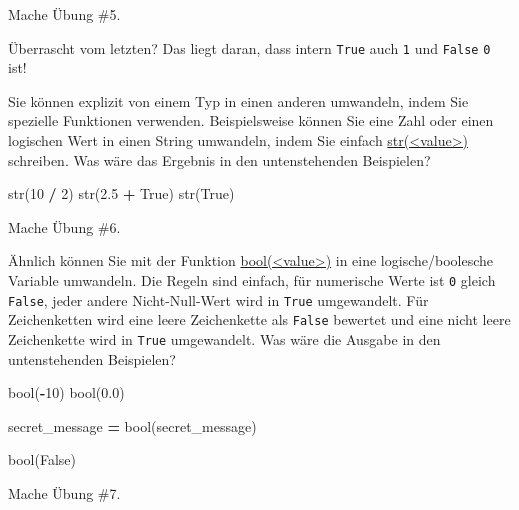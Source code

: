 \documentclass[
]{book}
\newenvironment{Shaded}{\begin{snugshade}}{\end{snugshade}}
\newcommand{\BuiltInTok}[1]{#1}
\newcommand{\DecValTok}[1]{\textcolor[rgb]{0.00,0.00,0.81}{#1}}
\newcommand{\FloatTok}[1]{\textcolor[rgb]{0.00,0.00,0.81}{#1}}
\newcommand{\NormalTok}[1]{#1}
\newcommand{\OperatorTok}[1]{\textcolor[rgb]{0.81,0.36,0.00}{\textbf{#1}}}
\newcommand{\StringTok}[1]{\textcolor[rgb]{0.31,0.60,0.02}{#1}}
\newcommand{\VariableTok}[1]{\textcolor[rgb]{0.00,0.00,0.00}{#1}}
\begin{document}
Mache Übung \#5.

Überrascht vom letzten? Das liegt daran, dass intern \texttt{True} auch \texttt{1} und \texttt{False} \texttt{0} ist!

Sie können explizit von einem Typ in einen anderen umwandeln, indem Sie spezielle Funktionen verwenden. Beispielsweise können Sie eine Zahl oder einen logischen Wert in einen String umwandeln, indem Sie einfach \href{https://docs.python.org/3/library/functions.html\#func-str}{str(\textless value\textgreater)} schreiben. Was wäre das Ergebnis in den untenstehenden Beispielen?

\begin{Shaded}
\begin{Highlighting}[]
\BuiltInTok{str}\NormalTok{(}\DecValTok{10} \OperatorTok{/} \DecValTok{2}\NormalTok{)}
\BuiltInTok{str}\NormalTok{(}\FloatTok{2.5} \OperatorTok{+} \VariableTok{True}\NormalTok{)}
\BuiltInTok{str}\NormalTok{(}\VariableTok{True}\NormalTok{)}
\end{Highlighting}
\end{Shaded}

Mache Übung \#6.

Ähnlich können Sie mit der Funktion \href{https://docs.python.org/3/library/functions.html\#bool}{bool(\textless value\textgreater)} in eine logische/boolesche Variable umwandeln. Die Regeln sind einfach, für numerische Werte ist \texttt{0} gleich \texttt{False}, jeder andere Nicht-Null-Wert wird in \texttt{True} umgewandelt. Für Zeichenketten wird eine leere Zeichenkette \texttt{\textquotesingle{}\textquotesingle{}} als \texttt{False} bewertet und eine nicht leere Zeichenkette wird in \texttt{True} umgewandelt. Was wäre die Ausgabe in den untenstehenden Beispielen?

\begin{Shaded}
\begin{Highlighting}[]
\BuiltInTok{bool}\NormalTok{(}\OperatorTok{{-}}\DecValTok{10}\NormalTok{)}
\BuiltInTok{bool}\NormalTok{(}\FloatTok{0.0}\NormalTok{)}

\NormalTok{secret\_message }\OperatorTok{=} \StringTok{\textquotesingle{}\textquotesingle{}}
\BuiltInTok{bool}\NormalTok{(secret\_message)}

\BuiltInTok{bool}\NormalTok{(}\StringTok{\textquotesingle{}False\textquotesingle{}}\NormalTok{)}
\end{Highlighting}
\end{Shaded}

Mache Übung \#7.
\end{document}
